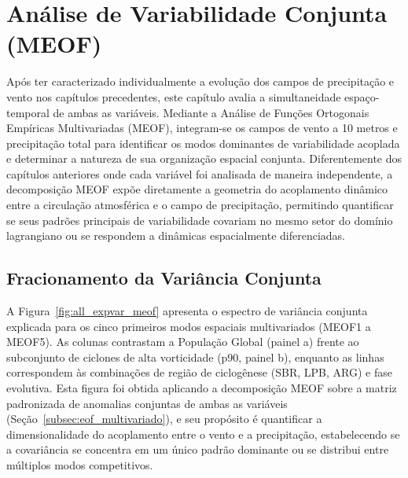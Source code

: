 \chapter{Análise de Variabilidade Conjunta (MEOF)}
\label{chap:meof}

Após ter caracterizado individualmente a evolução dos campos de precipitação e vento nos capítulos precedentes, este capítulo avalia a simultaneidade espaço-temporal de ambas as variáveis. 
Mediante a Análise de Funções Ortogonais Empíricas Multivariadas (MEOF), integram-se os campos de vento a 10 metros e precipitação total para identificar os modos dominantes de variabilidade acoplada e determinar a natureza de sua organização espacial conjunta. 
Diferentemente dos capítulos anteriores onde cada variável foi analisada de maneira independente, a decomposição MEOF expõe diretamente a geometria do acoplamento dinâmico entre a circulação atmosférica e o campo de precipitação, permitindo quantificar se seus padrões principais de variabilidade covariam no mesmo setor do domínio lagrangiano ou se respondem a dinâmicas espacialmente diferenciadas.

\section{Fracionamento da Variância Conjunta}
\label{sec:meof_varianza}

A Figura~\ref{fig:all_expvar_meof} apresenta o espectro de variância conjunta explicada para os cinco primeiros modos espaciais multivariados (MEOF1 a MEOF5). 
As colunas contrastam a População Global (painel a) frente ao subconjunto de ciclones de alta vorticidade (p90, painel b), enquanto as linhas correspondem às combinações de região de ciclogênese (SBR, LPB, ARG) e fase evolutiva. 
Esta figura foi obtida aplicando a decomposição MEOF sobre a matriz padronizada de anomalias conjuntas de ambas as variáveis (Seção~\ref{subsec:eof_multivariado}), e seu propósito é quantificar a dimensionalidade do acoplamento entre o vento e a precipitação, estabelecendo se a covariância se concentra em um único padrão dominante ou se distribui entre múltiplos modos competitivos.

